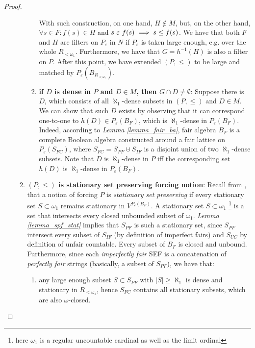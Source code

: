 \begin{proof}
\begin{enumerate}
\begin{enumerate}
\begin{enumerate}[label=(\roman*)]
                With such construction, on one hand, $H \notin M$, but, on the other hand, $\forall s \in F: f(s) \in H$ and $s \ \varepsilon\  f(s) \implies s \leq f(s)$. We have that both $F$ and $H$ are filters on $P_\varepsilon$ in $N$ if $P_\varepsilon$ is taken large enough, e.g. over the whole $R_{<\omega_1}$. Furthermore, we have that $G = h^{-1}(H)$ is also a filter on $P$. After this point, we have extended  $(P, \leq)$ to be large and matched by $P_\varepsilon(B_{R_{<\omega_1}})$.
                \item \boldmath\textbf{if $D$ is dense in $P$ and $D \in M$, then $G \cap D \neq \emptyset$}\unboldmath: Suppose there is \(D\), which consists of all $\aleph_1$-dense subsets in $(P, \leq)$ and $D \in M$. We can show that such $D$ exists by observing that it can correspond one-to-one to $h(D) \in P_\varepsilon(B_F)$, which is $\aleph_1$-dense in $P_\varepsilon(B_F)$. Indeed, according to \textit{Lemma \ref{lemma_fair_ba}}, fair algebra $B_F$ is a complete Boolean algebra constructed around a fair lattice on $P_{\varepsilon}(S_{FC})$, where $S_{FC} = S_{PF} \cupdot S_{IF}$ is a disjoint union of two $\aleph_1$-dense subsets. Note that $D$ is $\aleph_1$-dense in $P$ iff the corresponding set $h(D)$ is $\aleph_1$-dense in $P_\varepsilon(B_F)$. 
            \end{enumerate}
            \item \boldmath\textbf{$(P, \leq)$ is stationary set preserving forcing notion}\unboldmath: Recall from \cite{jech2003set}, that a notion of forcing $P$ is \textit{stationary set preserving} if every stationary set $S \subset \omega_1$ remains stationary in $V^{P_\varepsilon(B_F)}$. A stationary set $S \subset \omega_1$ \footnote{here $\omega_1$ is a regular uncountable cardinal as well as the limit ordinal} is a set that intersects every closed unbounded subset of $\omega_1$. \textit{Lemma \ref{lemma_spf_stat}} implies that $S_{PF}$ is such a stationary set, since $S_{PF}$ intersect every subset of $S_{IF}$ (by definition of imperfect fairs) and $S_{UC}$ by definition of unfair countable. Every subset of $B_F$ is closed and unbound. Furthermore, since each \textit{imperfectly fair} SEF is a concatenation of \textit{perfectly fair} strings (basically, a subset of $S_{PF}$), we have that: 
                \begin{enumerate}[label=(\roman*)]
                    \item any large enough subset $S \subset S_{PF}$ with $|S| \geq \aleph_1$ is dense and stationary in $R_{<\omega_1}$, hence $S_{FC}$ contains all stationary subsets, which are also $\omega$-closed.

\end{enumerate}
\end{enumerate}
\end{enumerate}
\end{proof}
